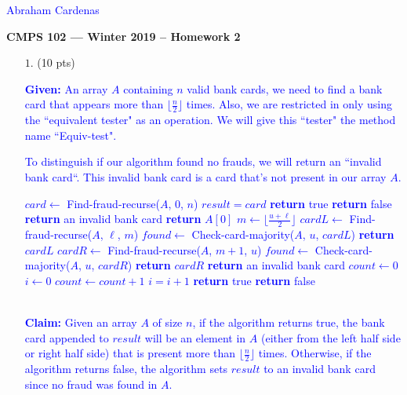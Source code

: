 \documentclass[11pt]{article}
\begin{document}
\textcolor{blue}{\hfill Abraham Cardenas} 

\begin{center}
{\bf\Large CMPS 102 --- Winter 2019 --  Homework 2}
\end{center}

\renewcommand{\P}{\mbox{IH}}

\begin{itemize}

\item[$1.$] (10 pts)

\textcolor{blue}{{\bf Given:} An array $A$ containing $n$ valid bank cards, we need to find a bank card that appears more than $\lfloor \frac{n}{2} \rfloor$ times. Also, we are restricted in only using the ``equivalent tester" as an operation. We will give this ``tester" the method name ``Equiv-test".}

\textcolor{blue}{ To distinguish if our algorithm found no frauds, we will return an ``invalid bank card``. This invalid bank card is a card that's not present in our array $A$.}

\textcolor{blue}{
\begin{algorithmic}[1]
 
	\State $card \gets$ Find-fraud-recurse($A$, 0, $n$)
		\State $result = card$
		\State \textbf{return} true
	\Else
		\State \textbf{return} false
	\EndIf
\EndFunction
{}
	\State \textbf{return} an invalid bank card 
	\State \textbf{return} $A[0]$
\Else
	\State ${m \gets \lfloor \frac{u + \ell}{2} \rfloor}$
	\State ${cardL \gets}$ Find-fraud-recurse($A$, $\ell$, $m$)
		\State $found \gets$ Check-card-majority($A$, $u$, $cardL$)
			\State \textbf{return} $cardL$
		\EndIf
	\EndIf
	\State ${cardR \gets}$ Find-fraud-recurse($A$, $m+1$, $u$)
			\State $found \gets$ Check-card-majority($A$, $u$, $cardR$)
				\State \textbf{return} $cardR$
			\EndIf
     	\EndIf
	\State \textbf{return} an invalid bank card
\EndIf
\EndFunction
{}
\State $count \gets 0$
\State $i \gets 0$
     		\State $count \gets count + 1$
     	\EndIf
     	\State $i = i + 1$
	\EndWhile
{}
	\State \textbf{return} true
\Else 
	\State \textbf{return} false
\EndIf
\EndFunction
\end{algorithmic}
}
\-\\
\textcolor{blue}{{\bf Claim:} Given an array $A$ of size $n$, if the algorithm returns true, the bank card appended to $result$ will be an element in $A$ (either from the left half side or right half side) that is present more than $\lfloor \frac{n}{2} \rfloor$ times. Otherwise, if the algorithm returns false, the algorithm sets $result$ to an invalid bank card since no fraud was found in $A$.}


\end{itemize}
\end{document}
